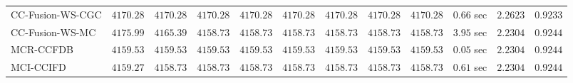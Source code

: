 \begin{table}[H]
\begin{tabular}{lrrrrrrrrrrr}
    CC-Fusion-WS-CGC & $      4170.28$ & $      4170.28$ & $      4170.28$ & $      4170.28$ & $      4170.28$ & $      4170.28$ & $      4170.28$ & $      4170.28$ & $         0.66$ sec    & $       2.2623$  & $       0.9233$ \\ 
     CC-Fusion-WS-MC & $      4175.99$ & $      4165.39$ & $      4158.73$ & $      4158.73$ & $      4158.73$ & $      4158.73$ & $      4158.73$ & $      4158.73$ & $         3.95$ sec    & $       2.2304$  & $       0.9244$ \\ 
\cmidrule{1-1} 
           MCR-CCFDB & $      4159.53$ & $      4159.53$ & $      4159.53$ & $      4159.53$ & $      4159.53$ & $      4159.53$ & $      4159.53$ & $      4159.53$ & $         0.05$ sec    & $       2.2304$  & $       0.9244$ \\ 
\cmidrule{1-1} 
           MCI-CCIFD & $      4159.27$ & $      4158.73$ & $      4158.73$ & $      4158.73$ & $      4158.73$ & $      4158.73$ & $      4158.73$ & $      4158.73$ & $         0.61$ sec    & $       2.2304$  & $       0.9244$ \\ 
\bottomrule
\end{tabular}
\end{table}

